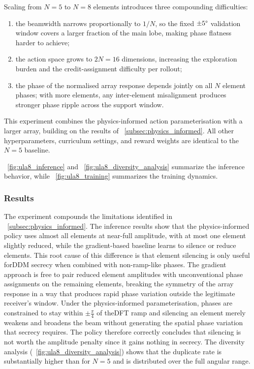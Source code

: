 Scaling from $N=5$ to $N=8$ elements introduces three compounding difficulties:
\begin{enumerate}
    \item the beamwidth narrows proportionally to $1/N$, so the fixed $\pm 5\degree$ validation window covers a larger fraction of the main lobe, making phase flatness harder to achieve;
    \item the action space grows to $2N=16$ dimensions, increasing the exploration burden and the credit-assignment difficulty per rollout;
    \item the phase of the normalised array response depends jointly on all $N$ element phases; with more elements, any inter-element misalignment produces stronger phase ripple across the support window.
\end{enumerate}
This experiment combines the physics-informed action parameterisation with a larger array, building on the results of \subsectionname~\ref{subsec:physics_informed}. All other hyperparameters, curriculum settings, and reward weights are identical to the $N=5$ baseline.

\figurename~\ref{fig:ula8_inference} and \figurename~\ref{fig:ula8_diversity_analysis} summarize the inference behavior, while \figurename~\ref{fig:ula8_training} summarizes the training dynamics.

\subsubsection{Results}
The experiment compounds the limitations identified in \subsectionname~\ref{subsec:physics_informed}. The inference results show that the physics-informed policy uses almost all elements at near-full amplitude, with at most one element slightly reduced, while the gradient-based baseline learns to silence or reduce elements. This root cause of this difference is that element silencing is only useful for\gls{DDM} secrecy when combined with non-ramp-like phases. The gradient approach is free to pair reduced element amplitudes with unconventional phase assignments on the remaining elements, breaking the symmetry of the array response in a way that produces rapid phase variation outside the legitimate receiver's window. Under the physics-informed parameterisation, phases are constrained to stay within $\pm\frac{\pi}{4}$ of the\gls{DFT} ramp and silencing an element merely weakens and broadens the beam without generating the spatial phase variation that secrecy requires. The policy therefore correctly concludes that silencing is not worth the amplitude penalty since it gains nothing in secrecy. The diversity analysis (\figurename~\ref{fig:ula8_diversity_analysis}) shows that the duplicate rate is substantially higher than for $N=5$ and is distributed over the full angular range.

